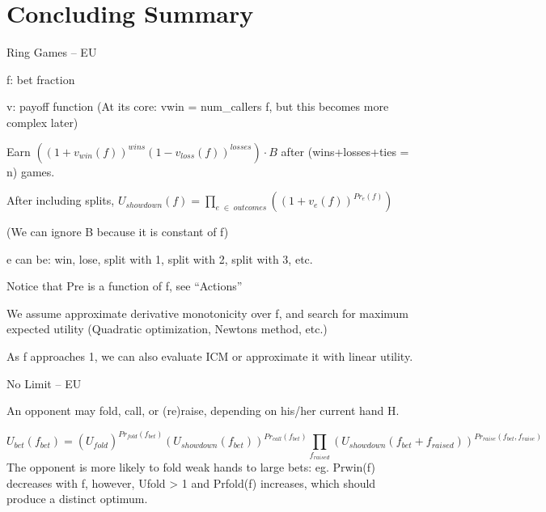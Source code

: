 


\chapter{Concluding Summary}
\label{sec:Summary}

Ring Games -- EU

f: bet fraction

v: payoff function (At it{\textquotesingle}s core: vwin = num\_callers {\texttimes} f, but this becomes more complex later) 

Earn $\left((1+v_{\mathit{win}}\left(f\right))^{\mathit{wins}}(1-v_{\mathit{loss}}\left(f\right))^{\mathit{losses}}\right)\cdot B$ after (wins+losses+ties = n) games.


\bigskip


\bigskip

After including splits,  $U_{\mathit{showdown}}\left(f\right)=\prod _{e\;\in \;\mathit{outcomes}}\left((1+v_{e}\left(f\right))^{\mathit{Pr}_{e}\left(f\right)}\right)$ 

(We can ignore B because it is constant of f)

e can be: win, lose, split with 1, split with 2, split with 3, etc.

Notice that Pre is a function of f, see {\textquotedblleft}Actions{\textquotedblright}


\bigskip

We assume approximate derivative monotonicity over f, and search for maximum expected utility (Quadratic optimization, Newton{\textquotesingle}s method, etc.)


\bigskip

As f approaches 1, we can also evaluate ICM or approximate it with linear utility.


\bigskip

No Limit -- EU

An opponent may fold, call, or (re)raise, depending on his/her current hand H.

\begin{equation*}
U_{\mathit{bet}}\left(f_{\mathit{bet}}\right)=\left(U_{\mathit{fold}}\right)^{\mathit{Pr}_{\mathit{fold}}\left(f_{\mathit{bet}}\right)}\left(U_{\mathit{showdown}}\left(f_{\mathit{bet}}\right)\right)^{\mathit{Pr}_{\mathit{call}}\left(f_{\mathit{bet}}\right)}\prod _{f_{\mathit{raised}}}\left(U_{\mathit{showdown}}\left(f_{\mathit{bet}}+f_{\mathit{raised}}\right)\right)^{\mathit{Pr}_{\mathit{raise}}\left(f_{\mathit{bet}},f_{\mathit{raise}}\right)}
\end{equation*}
The opponent is more likely to fold weak hands to large bets: eg. Prwin(f) decreases with f, however, Ufold {\textgreater} 1 and Prfold(f) increases, which should produce a distinct optimum.

